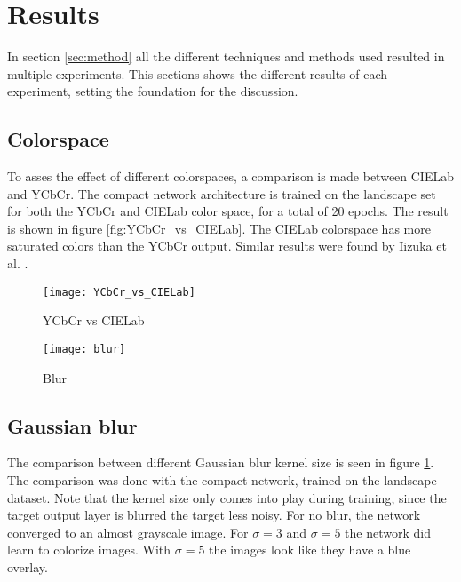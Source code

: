 \section{Results}\label{sec:results}
	
In section \ref{sec:method} all the different techniques and methods used resulted in multiple experiments. This sections shows the different results of each experiment, setting the foundation for the discussion.

\subsection{Colorspace}
To asses the effect of different colorspaces, a comparison is made between CIELab and YCbCr. The compact network architecture is trained on the landscape set for both the YCbCr and CIELab color space, for a total of 20 epochs. The result is shown in figure \ref{fig:YCbCr_vs_CIELab}. The CIELab colorspace has more saturated colors than the YCbCr output. Similar results were found by Iizuka et al. \cite{IizukaSIGGRAPH2016}.

\begin{figure}
	\begin{minipage}{.5\textwidth}
		
		\centering
		\texttt{[image: YCbCr\_vs\_CIELab]}
		\caption{YCbCr vs CIELab}
		\label{fig:YCbCr_vs_CIELab}
		
	\end{minipage}
	\begin{minipage}{0.5\textwidth}
			\centering
			\texttt{[image: blur]}
			\caption{Blur}
			\label{fig:blur}
	\end{minipage}
\end{figure}

\subsection{Gaussian blur}
The comparison between different Gaussian blur kernel size is seen in figure \ref{fig:blur}. The comparison was done with the compact network, trained on the landscape dataset. Note that the kernel size only comes into play during training, since the target output layer is blurred the target less noisy. For no blur, the network converged to an almost grayscale image. For $\sigma = 3$ and $\sigma = 5$ the network did learn to colorize images. With $\sigma = 5$ the images look like they have a blue overlay.

